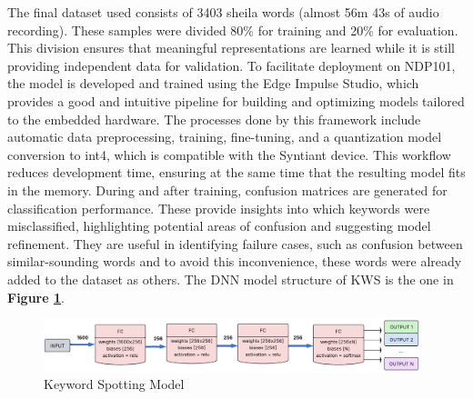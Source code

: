 The final dataset used consists of 3403 sheila words (almost 56m 43s of audio recording). These samples were divided 80\% for training and 20\% for evaluation. This division ensures that meaningful representations are learned while it is still providing independent data for validation.
To facilitate deployment on NDP101, the model is developed and trained using the Edge Impulse Studio\cite{edgeimpulse_kws_example}, which provides a good and intuitive pipeline for building and optimizing models tailored to the embedded hardware. The processes done by this framework include automatic data preprocessing, training, fine-tuning, and a quantization model conversion to int4, which is compatible with the Syntiant device. This workflow reduces development time, ensuring at the same time that the resulting model fits in the memory.
During and after training, confusion matrices are generated for classification performance. These provide insights into which keywords were misclassified, highlighting potential areas of confusion and suggesting model refinement. They are useful in identifying failure cases, such as confusion between similar-sounding words and to avoid this inconvenience, these words were already added to the dataset as others. The DNN model structure of KWS is the one in \textbf{Figure \ref{fig:keyword spotting model}}.
\begin{center}
  \begin{figure}[!h]
  \centering
  \includegraphics[width=0.975\textwidth]{images/3.01 KWS Model.png}
  \caption{Keyword Spotting Model}
  \label{fig:keyword spotting model}
\end{figure}
\end{center}
